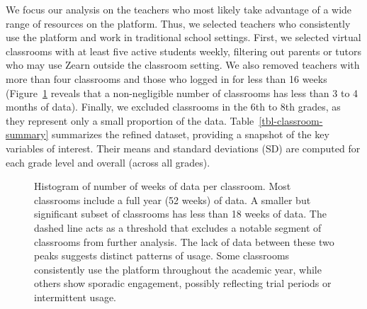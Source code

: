 \documentclass[
  number,
  preprint,
  3p,
  onecolumn]{elsarticle}
\begin{document}
We focus our analysis on the teachers who most likely take advantage of
a wide range of resources on the platform. Thus, we selected teachers
who consistently use the platform and work in traditional school
settings. First, we selected virtual classrooms with at least five
active students weekly, filtering out parents or tutors who may use
Zearn outside the classroom setting. We also removed teachers with more
than four classrooms and those who logged in for less than 16 weeks
(Figure~\ref{fig-classroom-weeks} reveals that a non-negligible number
of classrooms has less than 3 to 4 months of data). Finally, we excluded
classrooms in the 6th to 8th grades, as they represent only a small
proportion of the data. Table~\ref{tbl-classroom-summary} summarizes the
refined dataset, providing a snapshot of the key variables of interest.
Their means and standard deviations (SD) are computed for each grade
level and overall (across all grades).

\begin{figure}


\caption{\label{fig-classroom-weeks}Histogram of number of weeks of data
per classroom. Most classrooms include a full year (52 weeks) of data. A
smaller but significant subset of classrooms has less than 18 weeks of
data. The dashed line acts as a threshold that excludes a notable
segment of classrooms from further analysis. The lack of data between
these two peaks suggests distinct patterns of usage. Some classrooms
consistently use the platform throughout the academic year, while others
show sporadic engagement, possibly reflecting trial periods or
intermittent usage.}

\end{figure}%
\end{document}
